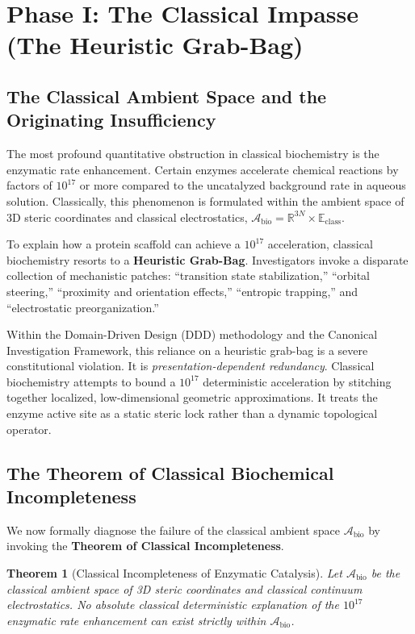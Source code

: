 \documentclass[11pt,openany]{extbook}
\theoremstyle{plain}
\newtheorem{theorem}{Theorem}[chapter]
\theoremstyle{definition}
\begin{document}
\section{Phase I: The Classical Impasse (The Heuristic Grab-Bag)}

\subsection{The Classical Ambient Space and the Originating Insufficiency}
The most profound quantitative obstruction in classical biochemistry is the enzymatic rate enhancement. Certain enzymes accelerate chemical reactions by factors of $10^{17}$ or more compared to the uncatalyzed background rate in aqueous solution. Classically, this phenomenon is formulated within the ambient space of 3D steric coordinates and classical electrostatics, $\mathcal{A}_{\text{bio}} = \mathbb{R}^{3N} \times \mathbb{E}_{\text{class}}$.

To explain how a protein scaffold can achieve a $10^{17}$ acceleration, classical biochemistry resorts to a \textbf{Heuristic Grab-Bag}. Investigators invoke a disparate collection of mechanistic patches: ``transition state stabilization,'' ``orbital steering,'' ``proximity and orientation effects,'' ``entropic trapping,'' and ``electrostatic preorganization.''

Within the Domain-Driven Design (DDD) methodology and the Canonical Investigation Framework, this reliance on a heuristic grab-bag is a severe constitutional violation. It is \textit{presentation-dependent redundancy}. Classical biochemistry attempts to bound a $10^{17}$ deterministic acceleration by stitching together localized, low-dimensional geometric approximations. It treats the enzyme active site as a static steric lock rather than a dynamic topological operator.

\subsection{The Theorem of Classical Biochemical Incompleteness}
We now formally diagnose the failure of the classical ambient space $\mathcal{A}_{\text{bio}}$ by invoking the \textbf{Theorem of Classical Incompleteness}.

\begin{theorem}[Classical Incompleteness of Enzymatic Catalysis]
Let $\mathcal{A}_{\text{bio}}$ be the classical ambient space of 3D steric coordinates and classical continuum electrostatics. No absolute classical deterministic explanation of the $10^{17}$ enzymatic rate enhancement can exist strictly within $\mathcal{A}_{\text{bio}}$.
\end{theorem}
\end{document}
